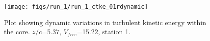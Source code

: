 \begin{figure}[H]
\centering
\texttt{[image: figs/run\_1/run\_1\_ctke\_01rdynamic]}
\caption{Plot showing dynamic variations in turbulent kinetic energy within the core. $z/c$=5.37, $V_{free}$=15.22, station 1.}
\label{fig:run_1_ctke_01rdynamic}
\end{figure}


